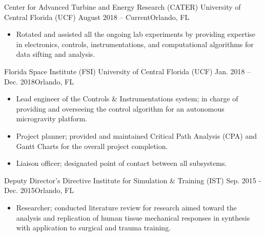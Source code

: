 \documentclass[10pt,a4paper]{altacv}
\begin{document}
\divider

{Center for Advanced Turbine and Energy Research (CATER)  \newline
University of Central Florida (UCF)}
{August 2018 -- Current}{Orlando, FL}

\begin{itemize}
    \item Rotated and assisted all the ongoing lab experiments by providing expertise in electronics, controls, instrumentations, and computational algorithms for data sifting and analysis.
\end{itemize}

\divider

{Florida Space Institute (FSI) \newline
University of Central Florida (UCF)}
{Jan. 2018 --  Dec. 2018}{Orlando, FL}
\begin{itemize}
    \item Lead engineer of the Controls \& Instrumentations system; in charge of providing and overseeing the control algorithm for an autonomous microgravity platform.

    \item Project planner; provided and maintained Critical Path Analysis (CPA) and Gantt Charts for the overall project completion.

    \item Liaison officer; designated point of contact between all subsystems.
\end{itemize}

\divider

{Deputy Director’s Directive  \newline
Institute for Simulation \& Training (IST)}
{Sep. 2015 - Dec. 2015}{Orlando, FL}

\begin{itemize}
    \item Researcher; conducted literature review for research aimed toward the analysis and replication of human tissue mechanical responses in synthesis with application to surgical and trauma training.
\end{itemize}

\end{document}
